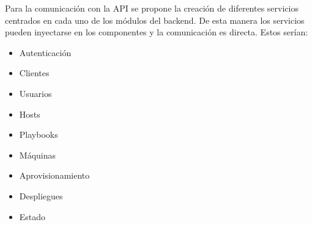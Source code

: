 \bigskip
Para la comunicación con la API se propone la creación de diferentes servicios centrados en cada uno de los módulos del backend. De esta manera los servicios pueden inyectarse en los componentes y la comunicación es directa. Estos serían:
\begin{itemize}
	\item Autenticación
	\item Clientes
	\item Usuarios
	\item Hosts
	\item Playbooks
	\item Máquinas
	\item Aprovisionamiento
	\item Despliegues
	\item Estado
\end{itemize}


